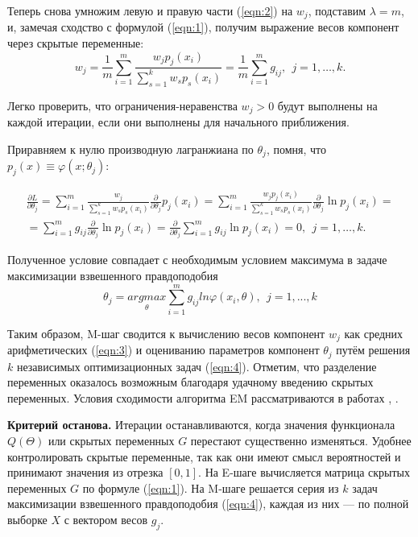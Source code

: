     Теперь снова умножим левую и правую части (\ref{eqn:2}) на $w_j$, подставим $\lambda = m$, и, замечая сходство с формулой (\ref{eqn:1}), получим выражение весов компонент через скрытые переменные:
    \begin{equation}
        \label{eqn:3}
        w_j = \frac{1}{m} \sum_{i=1}^m \frac{w_jp_j(x_i)}{\sum_{s=1}^k w_sp_s(x_i)} = \frac{1}{m} \sum_{i=1}^m g_{ij}, \ \ j = 1, \dots, k.
    \end{equation}

    Легко проверить, что ограничения-неравенства $w_j > 0$ будут выполнены на каждой итерации, если они выполнены для начального приближения.
    
    Приравняем к нулю производную лагранжиана по $\theta_j$, помня, что $p_j(x) \equiv \varphi(x; \theta_j)$:

    \begin{multline*}
        \frac{\partial L}{\partial \theta_j} = \sum_{i=1}^m \frac{w_j}{\sum_{s=1}^k w_sp_s(x_i)} \frac{\partial}{\partial \theta_j} p_j(x_i) = \sum_{i=1}^m \frac{w_jp_j(x_i)}{\sum_{s=1}^k w_sp_s(x_i)} \frac{\partial}{\partial \theta_j} \ln p_j(x_i) = \\ = \sum_{i=1}^m g_{ij} \frac{\partial}{\partial \theta_j} \ln p_j(x_i) = \frac{\partial}{\partial \theta_j} \sum_{i=1}^m g_{ij} \ln p_j (x_i) = 0, \ \ j = 1, \dots, k.
    \end{multline*}

    Полученное условие совпадает с необходимым условием максимума в задаче максимизации взвешенного правдоподобия
    \begin{equation}
        \label{eqn:4}
        \theta_j = \underset{\theta}{argmax} \sum_{i=1}^mg_{ij}ln\varphi(x_i, \theta), \ \ j =1, ..., k
    \end{equation}
    
    Таким образом, M-шаг сводится к вычислению весов компонент $w_j$ как средних арифметических (\ref{eqn:3}) и оцениванию параметров компонент $\theta_j$ путём решения $k$ независимых оптимизационных задач (\ref{eqn:4}). Отметим, что разделение переменных оказалось возможным благодаря удачному введению скрытых переменных. Условия сходимости алгоритма EM рассматриваются в работах \cite{first}, \cite{eighth}.
    
    \vspace{\baselineskip}
    \textbf{Критерий останова.} Итерации останавливаются, когда значения функционала $Q(\Theta)$ или скрытых переменных $G$ перестают существенно изменяться. Удобнее контролировать скрытые переменные, так как они имеют смысл вероятностей и принимают значения из отрезка $[0, 1]$. На E-шаге вычисляется матрица скрытых переменных $G$ по формуле (\ref{eqn:1}). На M-шаге решается серия из $k$ задач максимизации взвешенного правдоподобия (\ref{eqn:4}), каждая из них --- по полной выборке $X$ с вектором весов $g_j$.
    
